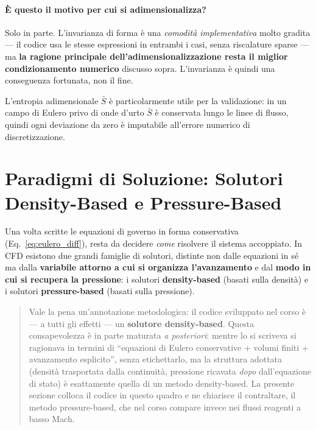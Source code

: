 \paragraph{È questo il motivo per cui si adimensionalizza?}
Solo in parte. L'invarianza di forma è una \emph{comodità implementativa} molto
gradita --- il codice usa le stesse espressioni in entrambi i casi, senza riscalature
sparse --- ma \textbf{la ragione principale dell'adimensionalizzazione resta il
miglior condizionamento numerico} discusso sopra. L'invarianza è quindi una
conseguenza fortunata, non il fine.

L'entropia adimensionale $\bar{S}$ è particolarmente utile per la validazione: in un
campo di Eulero privo di onde d'urto $\bar{S}$ è conservata lungo le linee di flusso,
quindi ogni deviazione da zero è imputabile all'errore numerico di discretizzazione.

\section{Paradigmi di Soluzione: Solutori Density-Based e Pressure-Based}
\label{sec:paradigmi}

Una volta scritte le equazioni di governo in forma conservativa
(Eq.~\eqref{eq:eulero_diff}), resta da decidere \emph{come} risolvere il sistema
accoppiato. In CFD esistono due grandi famiglie di solutori, distinte non dalle
equazioni in sé ma dalla \textbf{variabile attorno a cui si organizza l'avanzamento}
e dal \textbf{modo in cui si recupera la pressione}: i solutori
\textbf{density-based} (basati sulla densità) e i solutori \textbf{pressure-based}
(basati sulla pressione).

\begin{quote}
\small Vale la pena un'annotazione metodologica: il codice sviluppato nel corso è --- a
tutti gli effetti --- un \textbf{solutore density-based}. Questa consapevolezza è in parte
maturata \emph{a posteriori}: mentre lo si scriveva si ragionava in termini di ``equazioni
di Eulero conservative + volumi finiti + avanzamento esplicito'', senza etichettarlo, ma la
struttura adottata (densità trasportata dalla continuità, pressione ricavata
\emph{dopo} dall'equazione di stato) è esattamente quella di un metodo density-based. La
presente sezione colloca il codice in questo quadro e ne chiarisce il contraltare, il
metodo pressure-based, che nel corso compare invece nei flussi reagenti a basso Mach.
\end{quote}


